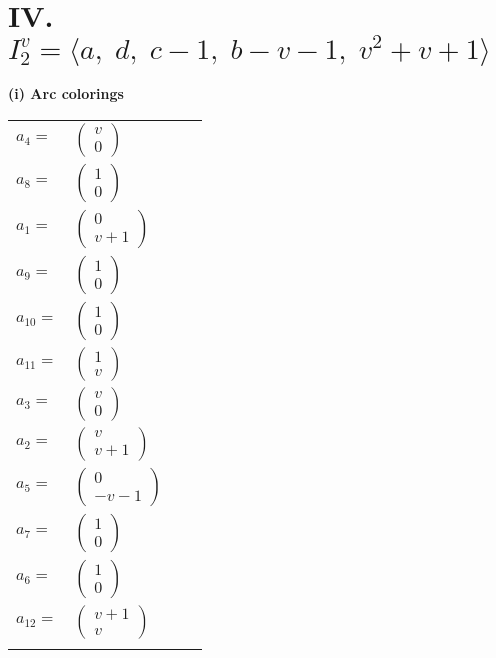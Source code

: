\documentclass[1p]{elsarticle_modified}
\theoremstyle{definition}
\begin{document}
\centering \section*{IV. $I^v_{2}= \langle a,\;d,\;c-1,\;b- v-1,\;v^2+v+1 \rangle$}
\flushleft \textbf{(i) Arc colorings}\\
\begin{tabular}{m{7pt} m{180pt} m{7pt} m{180pt} }
\flushright $a_{4}=$&$\begin{pmatrix}v\\0\end{pmatrix}$ \\
\flushright $a_{8}=$&$\begin{pmatrix}1\\0\end{pmatrix}$ \\
\flushright $a_{1}=$&$\begin{pmatrix}0\\v+1\end{pmatrix}$ \\
\flushright $a_{9}=$&$\begin{pmatrix}1\\0\end{pmatrix}$ \\
\flushright $a_{10}=$&$\begin{pmatrix}1\\0\end{pmatrix}$ \\
\flushright $a_{11}=$&$\begin{pmatrix}1\\v\end{pmatrix}$ \\
\flushright $a_{3}=$&$\begin{pmatrix}v\\0\end{pmatrix}$ \\
\flushright $a_{2}=$&$\begin{pmatrix}v\\v+1\end{pmatrix}$ \\
\flushright $a_{5}=$&$\begin{pmatrix}0\\- v-1\end{pmatrix}$ \\
\flushright $a_{7}=$&$\begin{pmatrix}1\\0\end{pmatrix}$ \\
\flushright $a_{6}=$&$\begin{pmatrix}1\\0\end{pmatrix}$ \\
\flushright $a_{12}=$&$\begin{pmatrix}v+1\\v\end{pmatrix}$\\&\end{tabular}
\end{document}
